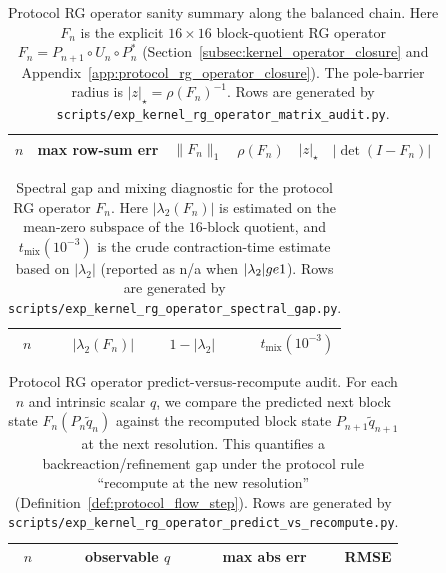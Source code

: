 \begin{table}[H]
\centering
\scriptsize
\setlength{\tabcolsep}{6pt}
\renewcommand{\arraystretch}{1.15}
\begin{tabular}{rrrrrr}
\toprule
$n$ & max row-sum err & $\|F_n\|_1$ & $\rho(F_n)$ & $|z|_\star$ & $|\det(I-F_n)|$ \\
\midrule
%
\end{tabular}
\caption{Protocol RG operator sanity summary along the balanced chain.
Here $F_n$ is the explicit $16\times 16$ block-quotient RG operator $F_n=P_{n+1}\circ U_n\circ P_n^\ast$ (Section~\ref{subsec:kernel_operator_closure} and Appendix~\ref{app:protocol_rg_operator_closure}).
The pole-barrier radius is $|z|_\star=\rho(F_n)^{-1}$. Rows are generated by \texttt{scripts/exp\_kernel\_rg\_operator\_matrix\_audit.py}.}
\label{tab:kernel_rg_operator_sanity}
\end{table}

\begin{table}[H]
\centering
\scriptsize
\setlength{\tabcolsep}{6pt}
\renewcommand{\arraystretch}{1.15}
\begin{tabular}{rrrr}
\toprule
$n$ & $|\lambda_2(F_n)|$ & $1-|\lambda_2|$ & $t_{\mathrm{mix}}(10^{-3})$ \\
\midrule
%
\end{tabular}
\caption{Spectral gap and mixing diagnostic for the protocol RG operator $F_n$.
Here $|\lambda_2(F_n)|$ is estimated on the mean-zero subspace of the $16$-block quotient, and
$t_{\mathrm{mix}}(10^{-3})$ is the crude contraction-time estimate based on $|\lambda_2|$ (reported as n/a when $|\lambda_2|\\ge 1$).
Rows are generated by \texttt{scripts/exp\_kernel\_rg\_operator\_spectral\_gap.py}.}
\label{tab:kernel_rg_operator_spectral_gap}
\end{table}

\begin{table}[H]
\centering
\scriptsize
\setlength{\tabcolsep}{6pt}
\renewcommand{\arraystretch}{1.15}
\begin{tabular}{rrr r}
\toprule
$n$ & observable $q$ & max abs err & RMSE \\
\midrule
%
\end{tabular}
\caption{Protocol RG operator predict-versus-recompute audit.
For each $n$ and intrinsic scalar $q$, we compare the predicted next block state $F_n(P_n\tilde q_n)$ against the recomputed block state $P_{n+1}\tilde q_{n+1}$ at the next resolution.
This quantifies a backreaction/refinement gap under the protocol rule ``recompute at the new resolution'' (Definition~\ref{def:protocol_flow_step}).
Rows are generated by \texttt{scripts/exp\_kernel\_rg\_operator\_predict\_vs\_recompute.py}.}
\label{tab:kernel_rg_operator_backreaction}
\end{table}

